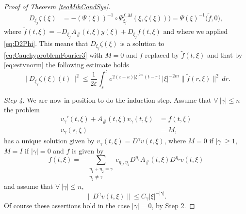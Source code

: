 \documentclass{amsart}
\theoremstyle{plain}
\theoremstyle{remark}
\theoremstyle{plain}
\numberwithin{equation}{section}
\begin{document}
\begin{proof}[Proof of Theorem \ref{teoMihCondSys}]
\begin{equation}
\begin{aligned}
D_{\xi_j} \zeta(\xi)  & = -(\Psi(\xi))^{-1} \circ \Psi^{f,M}_{\xi_j}(\xi,\zeta(\xi)))
 =\Psi(\xi)^{-1}\Big(\tilde{f},0\Big),
\nonumber
\end{aligned}
\end{equation}
where $\tilde{f}(t,\xi) = -D_{\xi_j} A_{\#}(t,\xi)y(\xi)+D_{\xi_j}f(t,\xi)$ and where we applied \eqref{eq:D2Phi}.
This means that $D_{\xi_j} \zeta(\xi)$ is a solution to \eqref{eq:CauchyproblemFourier3} with $M = 0$ and $f$ replaced by $\tilde{f}(t,\xi)$ and that by \eqref{eq:estvnorm} the following estimate holds
\begin{equation}\label{eq:estvnorm2}
\|D_{\xi_j} \zeta(\xi)(t)\|^2 \leq  \frac{1}{2\varepsilon} \int_s^t e^{2(\varepsilon-\kappa) |\xi|^{2m} (t-r)} |\xi|^{-2m} \|\tilde{f}(r,\xi)\|^2 \, dr.
\end{equation}

\medskip

{\em Step 4.}
We are now in position to do the induction step. Assume that $\forall\ |\gamma|\leq n$ the problem
\begin{equation}\label{eq:CauchyproblemFourierdifff}
\begin{aligned}
  v_{\gamma}'(t,\xi) + A_{\#}(t,\xi) v_{\gamma}(t,\xi) & = f(t,\xi)
 \\  v_{\gamma}(s,\xi) &= M,
\end{aligned}
\end{equation}
has a unique solution given by $v_{\gamma}(t,\xi) = D^{\gamma}v(t,\xi)$,
where $M = 0$ if $|\gamma|\geq 1$, $M = I$ if $|\gamma|=0$ and $f$ is given by
\[f(t,\xi) = - \sum_{\substack{\eta_{1}+\eta_{2}=\gamma \\ \eta_{2}\neq\gamma}}c_{\eta_{1},\eta_{2}}D^{\eta_{1}}A_{\#}(t,\xi)D^{\eta_{2}}v(t,\xi)\]
and assume that $\forall\ |\gamma|\leq n$,
\begin{equation}\label{eq:estIV}
\|D^{\gamma}v(t,\xi)\|\leq C_{\gamma} |\xi|^{-|\gamma|}.
\end{equation}
Of course these assertions hold in the case $|\gamma| = 0$, by Step 2.


\end{proof}
\end{document}
